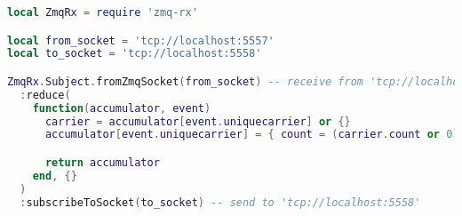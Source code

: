 \begin{lstlisting}[language=LUA,caption={Process pipeline with Zmq-RxLua: reducer.},label=rx-processing-reduce-events]
local ZmqRx = require 'zmq-rx'

local from_socket = 'tcp://localhost:5557'
local to_socket = 'tcp://localhost:5558'

ZmqRx.Subject.fromZmqSocket(from_socket) -- receive from 'tcp://localhost:5557'
  :reduce(
    function(accumulator, event)
      carrier = accumulator[event.uniquecarrier] or {}
      accumulator[event.uniquecarrier] = { count = (carrier.count or 0) + 1, total = (carrier.total or 0) + event.arrdelay }

      return accumulator
    end, {}
  )
  :subscribeToSocket(to_socket) -- send to 'tcp://localhost:5558'
\end{lstlisting}
